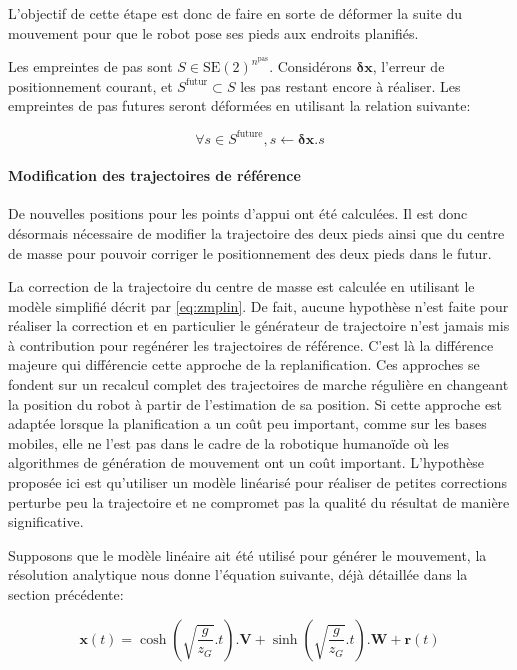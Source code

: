 L'objectif de cette étape est donc de faire en sorte de déformer la
suite du mouvement pour que le robot pose ses pieds aux endroits
planifiés.

Les empreintes de pas sont \mbox{$S \in
  \text{SE}(2)^{n^\text{pas}}$}. Considérons $\mathbf{\delta {x}}$,
l'erreur de positionnement courant, et \mbox{$S^{\text{futur}} \subset
  S$} les pas restant encore à réaliser. Les empreintes de pas futures
seront déformées en utilisant la relation suivante:

\begin{equation}\label{eq:footstepmodif}
  \forall s \in S^{\text{future}}, s \gets \mathbf{\delta {x}} . s
\end{equation}

\paragraph{Modification des trajectoires de référence}

De nouvelles positions pour les points d'appui ont été calculées. Il
est donc désormais nécessaire de modifier la trajectoire des deux
pieds ainsi que du centre de masse pour pouvoir corriger le
positionnement des deux pieds dans le futur.

La correction de la trajectoire du centre de masse est calculée en
utilisant le modèle simplifié décrit par \autoref{eq:zmplin}. De fait,
aucune hypothèse n'est faite pour réaliser la correction et en
particulier le générateur de trajectoire n'est jamais mis à
contribution pour regénérer les trajectoires de référence. C'est là la
différence majeure qui différencie cette approche de la
replanification. Ces approches se fondent sur un recalcul complet des
trajectoires de marche régulière en changeant la position du robot à
partir de l'estimation de sa position. Si cette approche est adaptée
lorsque la planification a un coût peu important, comme sur les bases
mobiles, elle ne l'est pas dans le cadre de la robotique humanoïde où
les algorithmes de génération de mouvement ont un coût
important. L'hypothèse proposée ici est qu'utiliser un modèle
linéarisé pour réaliser de petites corrections perturbe peu la
trajectoire et ne compromet pas la qualité du résultat de manière
significative.


Supposons que le modèle linéaire ait été utilisé pour générer le
mouvement, la résolution analytique nous donne l'équation suivante,
déjà détaillée dans la section précédente:

\begin{equation} \label{eq:zmpsol}
  \mathbf{x}(t) = \cosh(\sqrt{\frac{g}{z_G}}.t) . \mathbf{V} + \sinh(\sqrt{\frac{g}{z_G}}.t) . \mathbf{W} + \mathbf{r}(t)
\end{equation}


